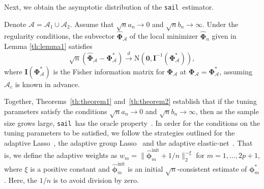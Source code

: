 \documentclass[useAMS,usenatbib,referee]{biom}
\newcommand{\sail}{\texttt{sail}}
\newcommand{\A}{\mathcal{A}}
\begin{document}
{\normalsize{}Next, we obtain the asymptotic distribution of the
	\sail ~estimator.}{\normalsize\par}




{\normalsize{}\begin{theorem} \label{th:theorem2}
		Denote $\mathcal{A}=\A_{1}\cup\A_{2}$. Assume that $\sqrt{n}a_{n}\rightarrow0$
		and $\sqrt{n}b_{n}\to\infty$. Under the regularity conditions, the
		subvector $\widehat{\boldsymbol{\Phi}}_{\A}$ of the local minimizer
		$\widehat{\boldsymbol{\Phi}}_{n}$ given in Lemma \eqref{th:lemma1}
		satisfies 
		\begin{equation}
		\sqrt{n}\left(\widehat{\boldsymbol{\Phi}}_{\A}-\boldsymbol{\Phi}_{\A}^{*}\right)\stackrel{d}{\rightarrow}\mathrm{N}\left(\mathbf{0},\mathbf{I}^{-1}\left(\boldsymbol{\Phi}_{\A}^{*}\right)\right),
		\end{equation}
		where $\mathbf{\mathbf{I}}\left(\boldsymbol{\Phi}_{\A}^{*}\right)$
		is the Fisher information matrix for $\boldsymbol{\Phi}_{\A}$ at
		$\boldsymbol{\Phi}_{\A}=\boldsymbol{\Phi}_{\A}^{*}$, assuming $\A_{c}$
		is known in advance. \end{theorem} }{\normalsize\par}

{\normalsize{}Together, Theorems~\eqref{th:theorem1}
	and~\eqref{th:theorem2} establish that if the tuning parameters
	satisfy the conditions $\sqrt{n}a_{n}\rightarrow0$ and $\sqrt{n}b_{n}\to\infty$,
	then as the sample size grows large, \sail ~has the oracle property~\citep{fan2001variable}.
	In order for the conditions on the tuning parameters to be satisfied,
	we follow the strategies outlined for the adaptive Lasso~\citep{zou2006adaptive},
	the adaptive group Lasso~\citep{nardi2008asymptotic} and the adaptive
	elastic-net~\citep{zou2009adaptive}. That is, we define the adaptive
	weights as $w_{m}=\|\widehat{\boldsymbol{\phi}}_{m}^{\text{init}}+1/n\|_{2}^{-\xi}$
	for $m=1,\ldots,2p+1$, where $\xi$ is a positive constant and $\widehat{\boldsymbol{\phi}}_{m}^{\text{init}}$
	is an initial $\sqrt{n}$-consistent estimate of $\boldsymbol{\phi}_{m}^{*}$.
	Here, the $1/n$ is to avoid division by zero. }{\normalsize\par}
\end{document}
